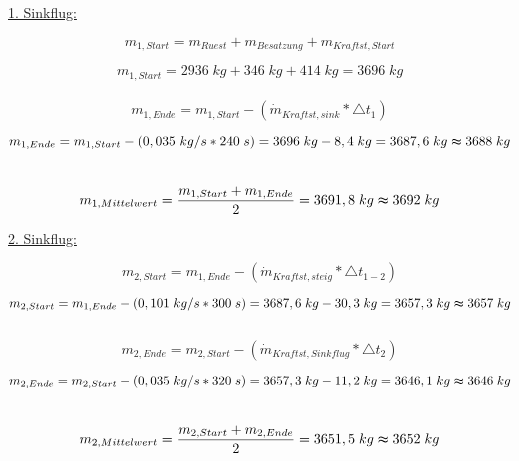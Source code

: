 \underline{1. Sinkflug:}

\begin{equation*}
m_{1,Start} = m_{Ruest} + m_{Besatzung} + m_{Kraftst,Start}
\end{equation*}

\begin{equation*}
m_{1,Start} = 2936 \; {kg} + 346 \; {kg} +414 \; {kg} = 3696 \; {kg}
\end{equation*}
\\

\begin{equation*}
m_{1,Ende} = m_{1,Start} - (\dot{m}_{Kraftst,sink} * \triangle t_1)
\end{equation*}

\begin{equation*}
m_{1,Ende} = m_{1,Start} - (0,035 \; {kg/s} * 240 \; {s}) = 3696 \; {kg} - 8,4 \; {kg} = 3687,6 \; {kg} \thickapprox 3688 \; {kg}
\end{equation*} \\

\begin{equation*}
m_{1,Mittelwert} = \frac{m_{1,Start} + m_{1,Ende}}{2} = 3691,8 \; {kg} \thickapprox 3692 \; {kg}
\end{equation*}

\vspace{5mm}
\underline{2. Sinkflug:}

\begin{equation*}
m_{2,Start} = m_{1,Ende} - (\dot{m}_{Kraftst,steig} * \triangle t_{1-2})
\end{equation*}

\begin{equation*}
m_{2,Start} = m_{1,Ende} - (0,101 \; {kg/s} * 300 \; {s}) = 3687,6 \; {kg} - 30,3 \; {kg} = 3657,3 \; {kg} \thickapprox 3657 \; {kg}
\end{equation*} \\

\begin{equation*}
m_{2,Ende} = m_{2,Start} - (\dot{m}_{Kraftst,Sinkflug} * \triangle t_2)
\end{equation*}

\begin{equation*}
m_{2,Ende} = m_{2,Start} - (0,035 \; {kg/s} * 320 \; {s}) = 3657,3 \; {kg} - 11,2 \; {kg} = 3646,1 \; {kg} \thickapprox 3646 \; {kg}
\end{equation*} \\

\begin{equation*}
m_{2,Mittelwert} = \frac{m_{2,Start} + m_{2,Ende}}{2} = 3651,5 \; {kg} \thickapprox 3652 \; {kg}
\end{equation*} \\

